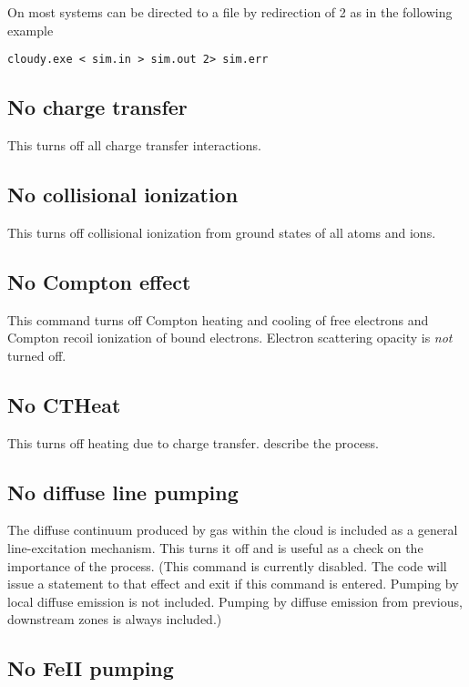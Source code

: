 On most systems  can be directed to a file by redirection of 2 as in the following example
\begin{verbatim}
cloudy.exe < sim.in > sim.out 2> sim.err
\end{verbatim}

\subsection{No charge transfer}

This turns off all charge transfer interactions.

\subsection{No collisional ionization}

This turns off collisional ionization from ground states of all atoms
and ions.

\subsection{No Compton effect}

This command turns off Compton heating and cooling of free electrons
and Compton recoil ionization of bound electrons.
Electron scattering opacity is \emph{not} turned off.

\subsection{No CTHeat}

This turns off heating due to charge transfer.
\citet{KingdonFerland1999} describe the process.

\subsection{No diffuse line pumping}

The diffuse continuum produced by gas within the cloud is included as
a general line-excitation mechanism.
This turns it off and is useful as
a check on the importance of the process.
(This command is currently disabled. The code will issue 
a statement to that effect and exit if this command
is entered.  Pumping by local diffuse emission
is not included.  Pumping by diffuse emission from previous, downstream
zones is always included.)

\subsection{No FeII pumping}

